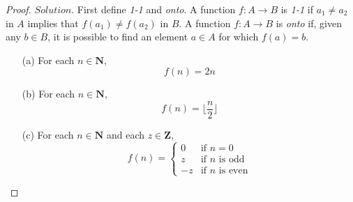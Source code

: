 \documentclass{article}
\begin{document}
\begin{proof}
$Solution.$
First define {\it 1-1} and {\it onto}. A function $f:A \to B$ is {\it 1-1} if $a_1 \neq a_2$ in $A$ implies that $f(a_1) \neq f(a_2)$ in $B$. A function $f:A \to B$ is {\it onto} if, given any $b \in B$, it is possible to find an element $a \in A$ for which $f(a) = b$.
\begin{enumerate}
    \item[(a)] For each $n \in \mathbf{N}$,
    \begin{equation*}
        f(n) = 2n
    \end{equation*}
    
    \item[(b)] For each $n \in \mathbf{N}$,
    \begin{equation*}
        f(n) = \lfloor \frac{n}{2} \rfloor
    \end{equation*} 
    
    \item[(c)] For each $n \in \mathbf{N}$ and each $z \in \mathbf{Z}$,
    \begin{equation*}
        f(n) = 
        \begin{cases}
        0 & \text{if $n = 0$}\\
        z & \text{if $n$ is odd}\\
        -z & \text{if $n$ is even}
        \end{cases}
    \end{equation*}
\end{enumerate}
\end{proof}
\end{document}
